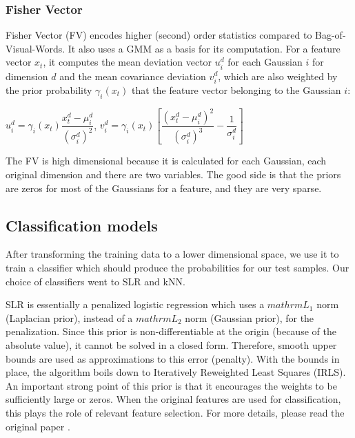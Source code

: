 \documentclass{article} %
\begin{document}
\subsubsection{Fisher Vector}

Fisher Vector (FV) encodes higher (second) order statistics compared to Bag-of-Visual-Words. 
It also uses a GMM as a basis for its computation. For a feature vector $x_t$, 
it computes the mean deviation vector $u_i^d$ for each Gaussian $i$ 
for dimension $d$ and the mean covariance deviation $v_i^d$, 
which are also weighted by the prior probability $\gamma_i(x_t)$ that 
the feature vector belonging to the Gaussian $i$:

\begin{center}
$u_i^d = \gamma_i(x_t) \dfrac{x_t^d - \mu_i^d}{(\sigma_i^d)^2}$,\quad \quad
\quad $v_i^d = \gamma_i(x_t) \left[ \dfrac{(x_t^d - \mu_i^d)^2}{(\sigma_i^d)^3} - \dfrac{1}{\sigma_i^d} \right]$
\end{center}

The FV is high dimensional because it is calculated for each Gaussian, each original dimension and 
there are two variables. The good side is that the priors are zeros for most of the Gaussians 
for a feature, and they are very sparse.

\subsection{Classification models}

After transforming the training data to a lower dimensional space, we use it to train a classifier 
which should produce the probabilities for our test samples. Our choice of classifiers went to SLR and kNN.

SLR is essentially a penalized logistic regression which uses a $mathrm{L_1}$ norm (Laplacian prior), 
instead of a $mathrm{L_2}$ norm (Gaussian prior), for the penalization. Since this prior 
is non-differentiable at the origin (because of the absolute value), it cannot be solved 
in a closed form. Therefore, smooth upper bounds are used as approximations to this error (penalty). 
With the bounds in place, the algorithm boils down to Iteratively Reweighted Least Squares (IRLS). 
An important strong point of this prior is that it encourages the weights to be sufficiently large or zeros. 
When the original features are used for classification, this plays the role of relevant feature selection. 
For more details, please read the original paper \cite{krishnapuram2005sparse}.
\end{document}
